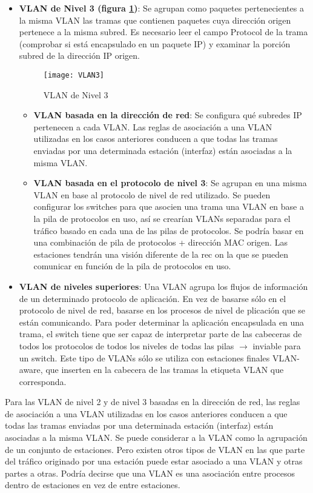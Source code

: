 \documentclass[10pt,portrait, twocolumn]{article}
\begin{document}
\begin{itemize}
		\item \textbf{VLAN de Nivel 3 (figura \ref{fig:VLAN3})}: Se agrupan como paquetes pertenecientes a la misma VLAN las tramas que contienen paquetes cuya dirección origen pertenece a la misma subred. Es necesario leer el campo Protocol de la trama (comprobar si está encapsulado en un paquete IP) y examinar la porción subred de la dirección IP origen.
		\begin{figure}[!ht]	
			\centering
		    	\texttt{[image: VLAN3]}
			\caption{VLAN de Nivel 3}
			\label{fig:VLAN3}
		\end{figure}  
			\begin{itemize}
			\item \textbf{VLAN basada en la dirección de red}: Se configura qué subredes IP pertenecen a cada VLAN. Las reglas de asociación a una VLAN utilizadas en los casos anteriores conducen a que todas las tramas enviadas por una determinada estación (interfaz) están asociadas a la misma VLAN.
			\item \textbf{VLAN basada en el protocolo de nivel 3}: Se agrupan en una misma VLAN en base al protocolo de nivel de red utilizado. Se pueden configurar los switches para que asocien una trama una VLAN en base a la pila de protocolos en uso, así se crearían VLANs separadas para el tráfico basado en cada una de las pilas de protocolos. Se podría basar en una combinación de pila de protocolos + dirección MAC origen. Las estaciones tendrán una visión diferente de la rec on la que se pueden comunicar en función de la pila de protocolos en uso.
			\end{itemize}
		\item \textbf{VLAN de niveles superiores}: Una VLAN agrupa los flujos de información de un determinado protocolo de aplicación. En vez de basarse sólo en el protocolo de nivel de red, basarse en los procesos de nivel de plicación que se están comunicando. Para poder determinar la aplicación encapsulada en una trama, el switch tiene que ser capaz de interpretar parte de las cabeceras de todos los protocolos de todos los niveles de todas las pilas $\rightarrow$ inviable para un switch. Este tipo de VLANs sólo se utiliza con estaciones finales VLAN-aware, que inserten en la cabecera de las tramas la etiqueta VLAN que corresponda.
	\end{itemize}
	
Para las VLAN de nivel 2 y de nivel 3 basadas en la dirección de red, las reglas de asociación a una VLAN utilizadas en los casos anteriores conducen a que todas las tramas enviadas por una determinada estación (interfaz) están asociadas a la misma VLAN. Se puede considerar a la VLAN como la agrupación de un conjunto de estaciones. Pero existen otros tipos de VLAN en las que parte del tráfico originado por una estación puede estar asociado a una VLAN y otras partes a otras. Podría decirse que una VLAN es una asociación entre procesos dentro de estaciones en vez de entre estaciones.\\
\end{document}
